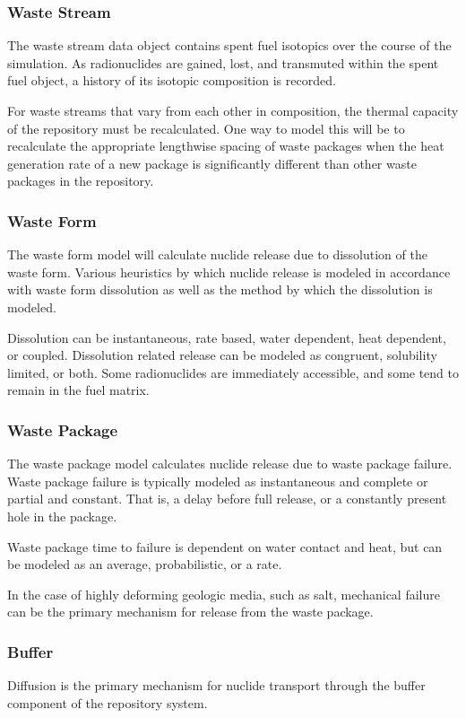 \subsubsection{Waste Stream}

The waste stream data object contains spent fuel isotopics over the 
course of the simulation. As radionuclides are gained, lost, and transmuted within 
the spent fuel object, a history of its isotopic composition is recorded.

For waste streams that vary from each other in composition, the thermal capacity 
of the repository must be recalculated. One way to model this will be to 
recalculate the appropriate lengthwise spacing of waste packages when the heat 
generation rate of a new package is significantly different than other waste 
packages in the repository. 

\subsubsection{Waste Form}
The waste form model will calculate nuclide release due to dissolution 
of the waste form. Various heuristics by which nuclide release is modeled in 
accordance with waste form dissolution as well as the method by which 
the dissolution is modeled.

Dissolution can be instantaneous, rate based, water dependent, heat 
dependent, or coupled.  Dissolution related release can be modeled as congruent, solubility 
limited, or both. Some radionuclides are immediately accessible, and some 
tend to remain in the fuel matrix. 

\subsubsection{Waste Package}
The waste package model calculates nuclide release due to waste 
package failure. Waste package failure is typically modeled as 
instantaneous and complete or partial and constant. That is, a delay 
before full release, or a constantly present hole in the package.

Waste package time to failure is dependent on water contact and heat, 
but can be modeled as an average, probabilistic, or a rate.

In the case of highly deforming geologic media, such as salt, 
mechanical failure can be the primary mechanism for release from the 
waste package.

\subsubsection{Buffer}
Diffusion is the primary mechanism for nuclide transport through the 
buffer component of the repository system.  

